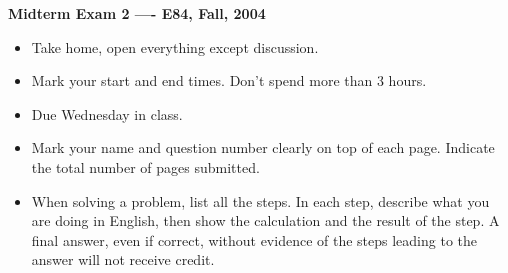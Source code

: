 \usepackage{html}

\begin{center}
{\Large \bf  Midterm Exam 2 ---- E84, Fall, 2004}
\end{center}

\begin{itemize}
\item Take home, open everything except discussion.
\item Mark your start and end times. Don't spend more than 3 hours.
\item Due Wednesday in class.
\item Mark your name and question number clearly on top of each page.
	Indicate the total number of pages submitted.
\item When solving a problem, list all the steps. In each step, describe 
	what you are doing in English, then show the calculation and the 
	result of the step. A final answer, even if correct, without 
	evidence of the steps leading to the answer will not receive credit.
\end{itemize}


